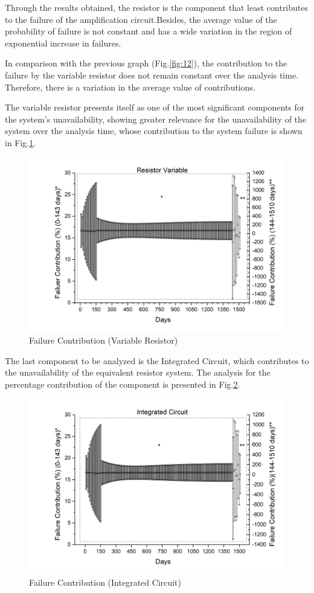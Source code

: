 \documentclass{ws-m3as}
\begin{document}
Through the results obtained, the resistor is the component that least contributes to the failure of the amplification circuit.Besides, the average value of the probability of failure is not constant and has a wide variation in the region of exponential increase in failures.
 
In comparison with the previous graph (Fig.\ref{fig:12}), the contribution to the failure by the variable resistor does not remain constant over the analysis time. Therefore, there is a variation in the average value of contributions.

The variable resistor presents itself as one of the most significant components for the system's unavailability, showing greater relevance for the unavailability of the system over the analysis time, whose contribution to the system failure is shown in Fig.\ref{fig:13}.

\begin{figure} [H]
	\centering
	\includegraphics[width=0.8\linewidth]{Figures/RVFull}
	\caption{Failure Contribution (Variable Resistor)}
	\label{fig:rvfull}
	\label{fig:13}
\end{figure}

The last component to be analyzed is the Integrated Circuit, which contributes to the unavailability of the equivalent resistor system. The analysis for the percentage contribution of the component is presented in Fig.\ref{fig:14}.

\begin{figure} [H]
	\centering
	\includegraphics[width=0.8\linewidth]{Figures/ICFull}
	\caption{Failure Contribution (Integrated Circuit)}
	\label{fig:icfull}
	\label{fig:14}
\end{figure}
\end{document}
